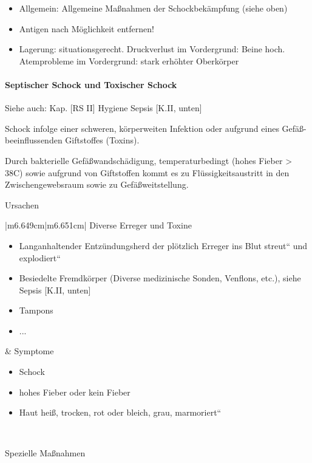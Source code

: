 \documentclass{article}
\begin{document}
\begin{itemize}
\item Allgemein: Allgemeine Ma{\ss}nahmen der Schockbek\"ampfung (siehe
oben) 

\item Antigen  nach M\"oglichkeit entfernen!

\item Lagerung: situationsgerecht. Druckverlust im Vordergrund: Beine
hoch.%
%
 Atemprobleme im Vordergrund: stark erh\"ohter Oberk\"orper

\end{itemize}
\paragraph[Septischer Schock und Toxischer Schock]{Septischer Schock und
Toxischer Schock}
\label{bkm:RefHeading41284910}Siehe auch: Kap. [RS II] Hygiene 
{\guillemotright} Sepsis
[K.II{\guillemotright}\pageref{bkm:RefHeading41252510}, unten]

Schock infolge einer schweren, k\"orperweiten Infektion oder aufgrund
eines Gef\"a{\ss}-beeinflussenden Giftstoffes (Toxins).

Durch bakterielle Gef\"a{\ss}wandsch\"adigung, temperaturbedingt (hohes
Fieber {\textgreater} 38{\textdegree}C) sowie aufgrund von Giftstoffen
kommt es zu Fl\"ussigkeitsaustritt in den Zwischen\-gewebs\-raum sowie
zu Gef\"a{\ss}weitstellung.

Ursachen

\begin{center}
\tablehead{}\begin{supertabular}{|m{6.649cm}|m{6.651cm}|}
\hline
Diverse Erreger und Toxine

\begin{itemize}
\item Langanhaltender Entz\"undungsherd der pl\"otzlich Erreger
{\quotedblbase}ins Blut streut{\textquotedblleft} und
{\quotedblbase}explodiert{\textquotedblleft}

\item Besiedelte Fremdk\"orper (Diverse medizinische Sonden, Venflons,
etc.), siehe Sepsis
[K.II{\guillemotright}\pageref{bkm:RefHeading41252510}, unten]

\item Tampons

\item ...

\end{itemize}
 &
Symptome

\begin{itemize}
\item Schock

\item hohes Fieber oder kein Fieber

\item Haut hei{\ss}, trocken, rot oder bleich, grau,
{\quotedblbase}marmoriert{\textquotedblleft}

\end{itemize}
\\\hline
\end{supertabular}
\end{center}
Spezielle Ma{\ss}nahmen
\end{document}
